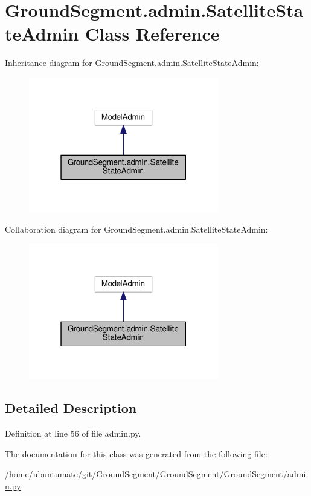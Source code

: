 \hypertarget{class_ground_segment_1_1admin_1_1_satellite_state_admin}{}\section{Ground\+Segment.\+admin.\+Satellite\+State\+Admin Class Reference}
\label{class_ground_segment_1_1admin_1_1_satellite_state_admin}


Inheritance diagram for Ground\+Segment.\+admin.\+Satellite\+State\+Admin\+:\nopagebreak
\begin{figure}[H]
\begin{center}
\leavevmode
\includegraphics[width=235pt]{class_ground_segment_1_1admin_1_1_satellite_state_admin__inherit__graph}
\end{center}
\end{figure}


Collaboration diagram for Ground\+Segment.\+admin.\+Satellite\+State\+Admin\+:\nopagebreak
\begin{figure}[H]
\begin{center}
\leavevmode
\includegraphics[width=235pt]{class_ground_segment_1_1admin_1_1_satellite_state_admin__coll__graph}
\end{center}
\end{figure}


\subsection{Detailed Description}


Definition at line 56 of file admin.\+py.



The documentation for this class was generated from the following file\+:\begin{DoxyCompactItemize}
\item 
/home/ubuntumate/git/\+Ground\+Segment/\+Ground\+Segment/\+Ground\+Segment/\hyperlink{admin_8py}{admin.\+py}\end{DoxyCompactItemize}
